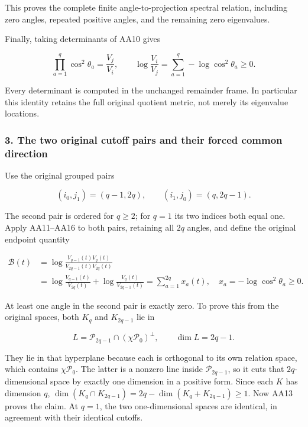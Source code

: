 \documentclass{article}
\begin{document}
This proves the complete finite angle-to-projection spectral relation, including zero angles, repeated positive angles, and the remaining zero eigenvalues.

Finally, taking determinants of AA10 gives

\[
\prod_{a=1}^q\cos^2\theta_a
=\frac{V_j}{V_i},\qquad
\log\frac{V_i}{V_j}
=\sum_{a=1}^q -\log\cos^2\theta_a\ge0.
\tag{AA16}
\]

Every determinant is computed in the unchanged remainder frame. In particular this identity retains the full original quotient metric, not merely its eigenvalue locations.

\subsubsection{3. The two original cutoff pairs and their forced common direction}\label{endpoint-all_degree_angle_review--the-two-original-cutoff-pairs-and-their-forced-common-direction}

Use the original grouped pairs

\[
(i_0,j_1)=(q-1,2q),\qquad
(i_1,j_0)=(q,2q-1).
\tag{AA17}
\]

The second pair is ordered for \(q\ge2\); for \(q=1\) its two indices both equal one. Apply AA11--AA16 to both pairs, retaining all \(2q\) angles, and define the original endpoint quantity

\[
\begin{aligned}
\mathcal B(t)
&=\log\frac{V_{q-1}(t)V_q(t)}{V_{2q-1}(t)V_{2q}(t)}\\
&=\log\frac{V_{q-1}(t)}{V_{2q}(t)}
 +\log\frac{V_q(t)}{V_{2q-1}(t)}
=\sum_{a=1}^{2q}x_a(t),\quad
x_a=-\log\cos^2\theta_a\ge0.
\end{aligned}
\tag{AA18}
\]

At least one angle in the second pair is exactly zero. To prove this from the original spaces, both \(K_q\) and \(K_{2q-1}\) lie in

\[
L=\mathcal P_{2q-1}\cap(\chi\mathcal P_0)^\perp,
\qquad\dim L=2q-1.
\tag{AA19}
\]

They lie in that hyperplane because each is orthogonal to its own relation space, which contains \(\chi\mathcal P_0\). The latter is a nonzero line inside \(\mathcal P_{2q-1}\), so it cuts that \(2q\)-dimensional space by exactly one dimension in a positive form. Since each \(K\) has dimension \(q\), \(\dim(K_q\cap K_{2q-1})=2q-\dim(K_q+K_{2q-1})\ge1\). Now AA13 proves the claim. At \(q=1\), the two one-dimensional spaces are identical, in agreement with their identical cutoffs.
\end{document}
